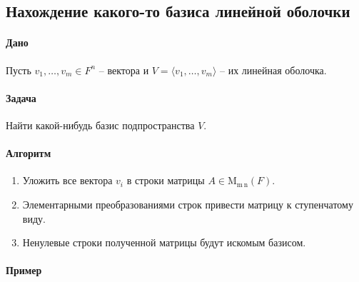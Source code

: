 \documentclass{article}
\newcommand{\MatrixDim}[3]{\operatorname{\mathrm{M}_{#2\,#3}}(#1)}
\begin{document}
\subsection{Нахождение какого-то базиса линейной оболочки}

\paragraph{Дано}

Пусть $v_1,\ldots,v_m\in F^n$ -- вектора и $V = \langle v_1,\ldots,v_m\rangle$ -- их линейная оболочка.

\paragraph{Задача}

Найти какой-нибудь базис подпространства $V$.

\paragraph{Алгоритм}

\begin{enumerate}
\item Уложить все вектора $v_i$ в строки матрицы $A\in \MatrixDim{F}{m}{n}$.

\item Элементарными преобразованиями строк привести матрицу к ступенчатому виду.

\item Ненулевые строки полученной матрицы будут искомым базисом.
\end{enumerate}

\paragraph{Пример}
\end{document}
